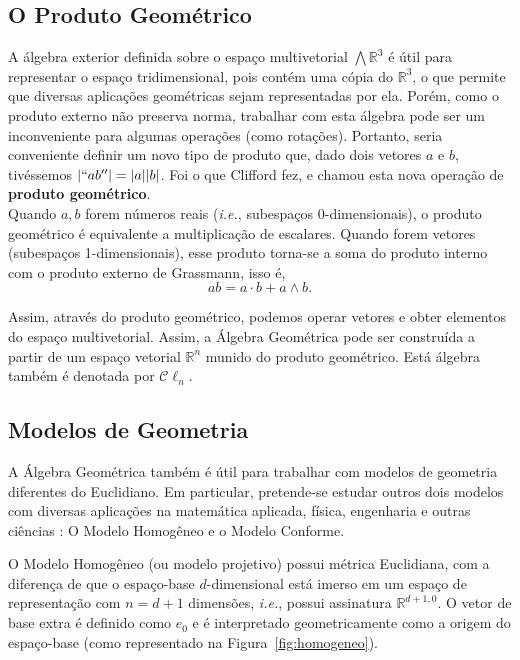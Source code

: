\documentclass[11pt]{article}
\begin{document}
\subsection{O Produto Geométrico}

A álgebra exterior definida sobre o espaço multivetorial $\bigwedge\mathbb{R}^3$ é útil para representar o espaço tridimensional, pois contém uma cópia do $\mathbb{R}^3$, o que permite que diversas aplicações geométricas sejam representadas por ela. Porém, como o produto externo não preserva norma, trabalhar com esta álgebra pode ser um inconveniente para algumas operações (como rotações). Portanto, seria conveniente definir um novo tipo de produto que, dado dois vetores $a$ e $b$, tivéssemos $|``ab''| = |a||b|$. Foi o que Clifford fez, e chamou esta nova operação de \textbf{produto geométrico}.
\\

Quando $a,b$ forem números reais (\textit{i.e.}, subespaços 0-dimensionais), o produto geométrico é equivalente a multiplicação de escalares. Quando forem vetores (subespaços 1-dimensionais), esse produto torna-se a soma do produto interno com o produto externo de Grassmann, isso é, $$ab = a\cdot b + a \wedge b.$$

Assim, através do produto geométrico, podemos operar vetores e obter elementos do espaço multivetorial. Assim, a Álgebra Geométrica pode ser construída a partir de um espaço vetorial $\mathbb{R}^n$ munido do produto geométrico. Está álgebra também é denotada por $\mathcal C \ell_n$.

\subsection{Modelos de Geometria}

A Álgebra Geométrica também é útil para trabalhar com modelos de geometria diferentes do Euclidiano. Em particular, pretende-se estudar outros dois modelos com diversas aplicações na matemática aplicada, física, engenharia e outras ciências \cite{dorst2010geometric}: O Modelo Homogêneo e o Modelo Conforme.

O Modelo Homogêneo (ou modelo projetivo) possui métrica Euclidiana, com a diferença de que o espaço-base $d$-dimensional está imerso em um espaço de representação com $n = d+1$ dimensões, \textit{i.e.}, possui assinatura $\mathbb{R}^{d+1,0}$. O vetor de base extra é definido como $e_0$ e é interpretado geometricamente como a origem do espaço-base (como representado na Figura~\ref{fig:homogeneo}).
\end{document}
